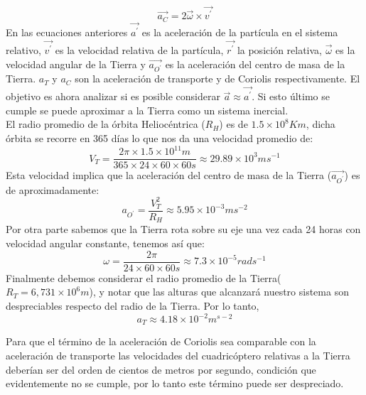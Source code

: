 \documentclass[main]{subfiles}
\begin{document}
\begin{equation}
\vec{a_C}=2\vec{\omega}\times\vec{v^\prime}
\end{equation}
En las ecuaciones anteriores $\vec{a^\prime}$ es la aceleraci\'on de la part\'icula en el sistema relativo, $\vec{v^\prime}$ es la velocidad relativa de la part\'icula, $\vec{r^\prime}$ la posici\'on relativa, $\vec{\omega}$ es la velocidad angular de la Tierra y $\vec{a_{O^\prime}}$ es la aceleraci\'on del centro de masa de la Tierra. $a_T$ y $a_C$ son la aceleraci\'on de transporte y de Coriolis respectivamente. El objetivo es ahora analizar si es posible considerar $\vec{a}\approx\vec{a^\prime}$. Si esto \'ultimo se cumple se puede aproximar a la Tierra como un sistema inercial.\\

El radio promedio de la \'orbita Helioc\'entrica ($R_H$) es de $1.5\times10^8Km$, dicha \'orbita se recorre en 365 d\'ias lo que nos da una velocidad promedio de:
\begin{equation}
V_T=\frac{2\pi\times1.5\times10^{11}m}{365\times24\times60\times60s}\approx29.89\times10^3ms^{-1}
\end{equation}
Esta velocidad implica que la aceleraci\'on del centro de masa de la Tierra ($\vec{a_{O^\prime}}$) es de aproximadamente:
\begin{equation}
a_{O^\prime}=\frac{V_T^2}{R_H}\approx5.95\times10^{-3}ms^{-2}
\end{equation}
Por otra parte sabemos que la Tierra rota sobre su eje una vez cada 24 horas con velocidad angular constante, tenemos as\'i que:
\begin{equation}
\omega=\frac{2\pi}{24\times60\times60s}\approx7.3\times10^{-5}rad s^{-1}
\end{equation}
Finalmente debemos considerar el radio promedio de la Tierra($R_T=6,731\times10^{6}m$), y notar que las alturas que alcanzar\'a nuestro sistema son despreciables respecto del radio de la Tierra. Por lo tanto,
\begin{equation}
a_T \approx 4.18\times10^{-2}m^{s-2}
\end{equation}

Para que el t\'ermino de la aceleraci\'on de Coriolis sea comparable con la aceleraci\'on de transporte las velocidades del cuadric\'optero relativas a la Tierra deber\'ian ser del orden de cientos de metros por segundo, condici\'on que evidentemente no se cumple, por lo tanto este t\'ermino puede ser despreciado.\\ 
\end{document}
